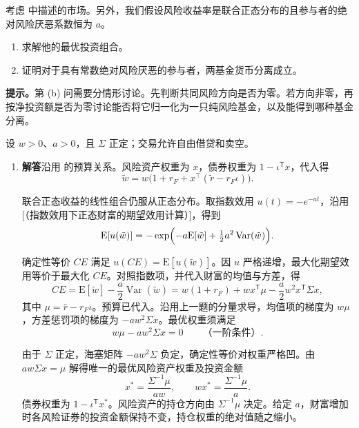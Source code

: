 \begin{problem}
 考虑 中描述的市场。另外，我们假设风险收益率是联合正态分布的且参与者的绝对风险厌恶系数恒为 $a$。
\begin{enumerate}[label=(\alph*)]
    \item 求解他的最优投资组合。
    \item 证明对于具有常数绝对风险厌恶的参与者，两基金货币分离成立。
\end{enumerate}
\par\smallskip
\textbf{提示。}第 (b) 问需要分情形讨论。先判断共同风险方向是否为零。若方向非零，再按净投资额是否为零讨论能否将它归一化为一只纯风险基金，以及能得到哪种基金分离。
\end{problem}
\begin{solution}[blank-type=manual,blank-vsep=9\baselineskip]
设 $w>0$、$a>0$，且 $\Sigma$ 正定；交易允许自由借贷和卖空。
\begin{enumerate}[label=(\alph*)]
    \item \textbf{解答}\quad 沿用 的预算关系。风险资产权重为 $x$，债券权重为 $1-\iota^{\mathsf T}x$，代入得
    \[
        \tilde{w}=w\bigl(1+r_{F}+x^{\top}(\tilde{r}-r_{F}\iota)\bigr).
    \]

    联合正态收益的线性组合仍服从正态分布。取指数效用 $u(t)=-e^{-at}$，沿用[（指数效用下正态财富的期望效用计算）]，得到
    \[
        \mathrm E[u(\tilde w)]
        =-\exp\Bigl(-a\mathrm E[\tilde w]+\tfrac12 a^2\operatorname{Var}(\tilde w)\Bigr).
    \]

    确定性等价 $CE$ 满足 $u(CE)=\mathrm E[u(\tilde w)]$。因 $u$ 严格递增，最大化期望效用等价于最大化 $CE$。对照指数项，并代入财富的均值与方差，得
    \[
      CE=\mathrm E[\tilde w]-\frac a2\operatorname{Var}(\tilde w)
        =w(1+r_F)+wx^{\mathsf T}\mu-\frac a2w^2x^{\mathsf T}\Sigma x,
    \]
    其中 $\mu=\bar r-r_F\iota$。预算已代入。沿用上一题的分量求导，均值项的梯度为 $w\mu$，方差惩罚项的梯度为 $-aw^2\Sigma x$。最优权重须满足
    \[
        w\mu-aw^{2}\Sigma x=0\qquad\text{（一阶条件）}.
    \]

    由于 $\Sigma$ 正定，海塞矩阵 $-aw^2\Sigma$ 负定，确定性等价对权重严格凹。由 $aw\Sigma x=\mu$ 解得唯一的最优风险资产权重及投资金额
    \[
        x^*=\frac{\Sigma^{-1}\mu}{aw},\qquad
        wx^*=\frac{\Sigma^{-1}\mu}{a}.
    \]
    债券权重为 $1-\iota^{\mathsf T}x^*$。风险资产的持仓方向由 $\Sigma^{-1}\mu$ 决定。给定 $a$，财富增加时各风险证券的投资金额保持不变，持仓权重的绝对值随之缩小。


\end{enumerate}
\end{solution}
